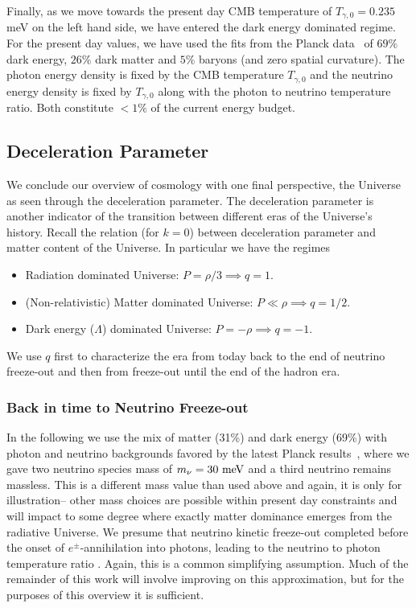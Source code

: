 Finally, as we move towards the present day CMB temperature of $T_{\gamma,0}=0.235$ meV on the left hand side, we have entered the dark energy dominated regime. For the present day values, we have used the fits from the Planck data~\cite{Planck} of $69\%$ dark energy, $26\%$ dark matter and $5\%$ baryons (and zero spatial curvature). The photon energy density is fixed by the CMB temperature $T_{\gamma,0}$ and the neutrino energy density is fixed by $T_{\gamma,0}$ along with the photon to neutrino temperature ratio. Both constitute $<1\%$ of the current energy budget.

\subsection{Deceleration Parameter}
We conclude our overview of cosmology with one final perspective, the Universe as seen through the deceleration parameter. The deceleration parameter is another indicator of the transition between different eras of the Universe's history. Recall the relation  (for $k=0$) between deceleration parameter and matter content of the Universe. In particular we have the regimes

\begin{itemize}
\item Radiation dominated Universe: $P=\rho/3 \implies q=1$.\\


\item (Non-relativistic) Matter dominated Universe: $P\ll\rho \implies q=1/2$.\\



\item Dark energy ($\Lambda$) dominated Universe: $P=-\rho \implies q=-1$.\\

\end{itemize}
We use $q$ first to characterize the era from today back to the end of neutrino freeze-out and then from freeze-out until the end of the hadron era.


\subsubsection{Back in time to Neutrino Freeze-out}\label{recomb}
In the following we use the mix of matter (31\%) and dark energy (69\%) with photon and neutrino backgrounds favored by the latest Planck results~\cite{Planck}, where we gave two neutrino species mass of $m_\nu=30\text{ meV}$ and a third neutrino remains massless. This is a different mass value than used above and again, it is only for illustration-- other mass choices are possible within present day constraints and will impact to some degree where exactly matter dominance emerges from the radiative Universe. We presume that neutrino kinetic freeze-out completed before the onset of $e^\pm$-annihilation into photons, leading to the neutrino to photon temperature ratio . Again, this is a common simplifying assumption. Much of the remainder of this work will involve improving on this approximation, but for the purposes of this overview it is sufficient.


